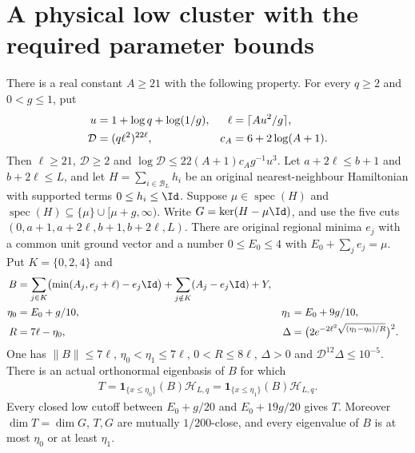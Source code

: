 \section{A physical low cluster with the required parameter bounds}

\begin{lemma}
    \label{thm:five_region_dg_cluster_parameters}
    \leanok
    There is a real constant $A\ge21$ with the following property.
    For every $q\ge2$ and $0<g\le1$, put
    \begin{align}
        u          & =1+\log q+\log(1/g), & \ell & =\lceil Au^2/g\rceil,\notag \\
        \mathcal D & =(q\ell^2)^{22\ell}, & c_A  & =6+2\log(A+1).
    \end{align}
    Then $\ell\ge21$, $\mathcal D\ge2$ and
    $\log\mathcal D\le22(A+1)c_Ag^{-1}u^3$.
    Let $a+2\ell\le b+1$ and $b+2\ell\le L$, and let
    $H=\sum_{i\in\mathcal B_L}h_i$ be an original nearest-neighbour
    Hamiltonian with supported terms $0\le h_i\le\Id$.
    Suppose $\mu\in\operatorname{spec}(H)$ and
    $\operatorname{spec}(H)\subseteq\{\mu\}\cup[\mu+g,\infty)$.
    Write $G=\ker(H-\mu\Id)$, and use the five cuts
    $(0,a+1,a+2\ell,b+1,b+2\ell,L)$.
    There are original regional minima $e_j$ with a common unit ground vector
    and a number $0\le E_0\le4$ with $E_0+\sum_j e_j=\mu$.
    Put $K=\{0,2,4\}$ and
    \begin{align}
        B      & =\sum_{j\in K}\bigl(\min(A_j,e_j+\ell)-e_j\Id\bigr)
        +\sum_{j\notin K}(A_j-e_j\Id)+Y,\notag                                                      \\
        \eta_0 & =E_0+g/10,                                            & \eta_1 & =E_0+9g/10,\notag \\
        R      & =7\ell-\eta_0,                                        &
        \Delta & =\bigl(2e^{-2\ell^2\sqrt{(\eta_1-\eta_0)/R}}\bigr)^2.
    \end{align}
    One has $\|B\|\le7\ell$, $\eta_0<\eta_1\le7\ell$, $0<R\le8\ell$,
    $\Delta>0$ and $\mathcal D^{12}\Delta\le10^{-5}$.
    There is an actual orthonormal eigenbasis of $B$ for which
    \begin{align}
        T=\mathbf1_{\{x\le\eta_0\}}(B)\mathcal H_{L,q}
        =\mathbf1_{\{x\le\eta_1\}}(B)\mathcal H_{L,q}.
    \end{align}
    Every closed low cutoff between $E_0+g/20$ and $E_0+19g/20$ gives $T$.
    Moreover $\dim T=\dim G$, $T,G$ are mutually $1/200$-close, and every
    eigenvalue of $B$ is at most $\eta_0$ or at least $\eta_1$.
\end{lemma}
